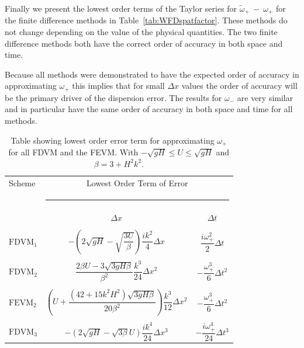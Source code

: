 Finally we present the lowest order terms of the Taylor series for $\widetilde{\omega}_+~-~\omega_+$ for the finite difference methods in Table~\ref{tab:WFDspatfactor}. These methods do not change depending on the value of the physical quantities. The two finite difference methods both have the correct order of accuracy in both space and time.  

Because all methods were demonstrated to have the expected order of accuracy in approximating $\omega_+$ this implies that for small $\Delta x$ values the order of accuracy will be the primary driver of the dispersion error. The results for $\omega_-$ are very similar and in particular have the same order of accuracy in both space and time for all methods. 

	\begin{table}
		\begin{tabular}{l  c  c}
			Scheme & \multicolumn{2}{c}{Lowest Order Term of Error}\\
			&  \multicolumn{2}{l}{\rule{0.7\textwidth}{0.4pt}} \\
			& $\Delta x$&$\Delta t$\\
			\hline && \\
			$\text{FDVM}_1$& $-\left(2 \sqrt{gH} - \sqrt{\dfrac{3U}{\beta }}\right)  \dfrac{ik^2}{4} \Delta x$ & $\dfrac{i \omega_+^2}{2} \Delta t$ \\ & & \\
			$\text{FDVM}_2$& $\dfrac{2\beta U -3 \sqrt{3 gH \beta}}{\beta^2}  \dfrac{k^3}{24}\Delta x ^2$ & $- \dfrac{\omega^3_+}{6 }  \Delta t^2$ \\ & & \\
			$\text{FEVM}_2$& $\left(U   + \dfrac{\left(42 + 15 k^2H^2\right) \sqrt{3gH \beta}}{20\beta^2}  \right) \dfrac{k^3}{12 } \Delta x^2$ &  $- \dfrac{\omega^3_+}{6 }  \Delta t^2$  \\ & & \\
			$\text{FDVM}_3$& $-\left({2\sqrt{gH} - \sqrt{3\beta}U }\right) \dfrac{ik^4}{24} \Delta x^3$ & $-\dfrac{i\omega^4_+}{24 } \Delta t^3$ \\ 
		\end{tabular}
		\caption{Table showing lowest order error term for approximating $\omega_+$ for all FDVM and the FEVM. With $ -\sqrt{gH} \le U \le \sqrt{gH}$ and $\beta = 3 + H^2 k^2 $. }
		\label{tab:Wfactor} 
	\end{table}

